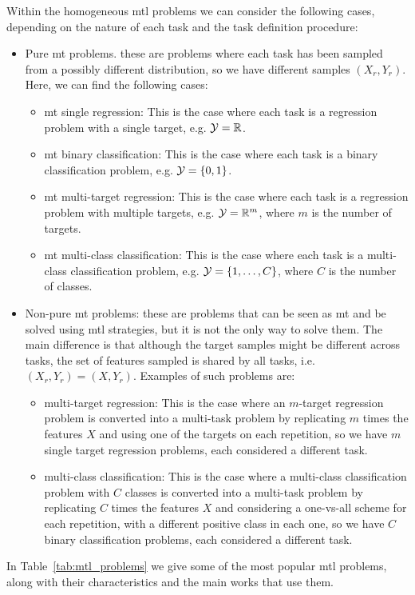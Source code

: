 Within the homogeneous \acrshort{mtl} problems we can consider the following cases, depending on the nature of each task and the task definition procedure:
\begin{itemize}
    \item Pure \acrshort{mt} problems. these are problems where each task has been sampled from a possibly different distribution, so we have different samples $(X_r, Y_r)$. Here, we can find the following cases:
    \begin{itemize}
        \item \acrshort{mt} single regression: This is the case where each task is a regression problem with a single target, e.g. $\mathcal{Y} = \mathbb{R}$. 
        \item \acrshort{mt} binary classification: This is the case where each task is a binary classification problem, e.g. $\mathcal{Y} = \left\{0, 1\right\}$. 
        \item \acrshort{mt} multi-target regression: This is the case where each task is a regression problem with multiple targets, e.g. $\mathcal{Y} = \mathbb{R}^m$, where $m$ is the number of targets. 
        \item \acrshort{mt} multi-class classification: This is the case where each task is a multi-class classification problem, e.g. $\mathcal{Y} = \left\{1, \ldots, C\right\}$, where $C$ is the number of classes.
    \end{itemize}
    \item Non-pure \acrshort{mt} problems: these are problems that can be seen as \acrshort{mt} and be solved using \acrshort{mtl} strategies, but it is not the only way to solve them. The main difference is that although the target samples might be different across tasks, the set of features sampled is shared by all tasks, i.e. $(X_r, Y_r) = (X, Y_r)$. Examples of such problems are:
    \begin{itemize}
        \item multi-target regression: This is the case where an $m$-target regression problem is converted into a multi-task problem by replicating $m$ times the features $X$ and using one of the targets on each repetition, so we have $m$ single target regression problems, each considered a different task.
        \item multi-class classification: This is the case where a multi-class classification problem with $C$ classes is converted into a multi-task problem by replicating $C$ times the features $X$ and considering a one-vs-all scheme for each repetition, with a different positive class in each one, so we have $C$ binary classification problems, each considered a different task.
    \end{itemize}
\end{itemize}
In Table~\ref{tab:mtl_problems} we give some of the most popular \acrshort{mtl} problems, along with their characteristics and the main works that use them.

